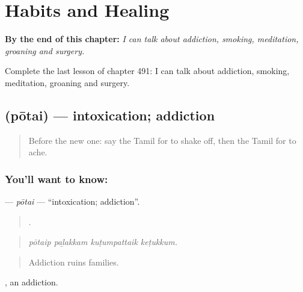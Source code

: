
\chapter{Habits and Healing}
\label{ch:ta-habits-and-healing}

\begin{chapteropening}
\textbf{By the end of this chapter:} \emph{I can talk about addiction, smoking, meditation, groaning and surgery.}

Complete the last lesson of chapter 491: I can talk about addiction, smoking, meditation, groaning and surgery.
\end{chapteropening}

\section[\texorpdfstring{\ta{போதை} (pōtai)}{போதை (pōtai)}]{ (pōtai) — intoxication; addiction}

\label{lesson:TA-C491-potai}



\begin{quote}
Before the new one: say the Tamil for to shake off, then the Tamil for to ache.
\end{quote}

\subsection*{You'll want to know: }
\textbf{} — \emph{pōtai} — \textquotedblleft{}intoxication; addiction\textquotedblright{}.

\begin{quote}
   .
\end{quote}

\begin{quote}
\emph{pōtaip paḻakkam kuṭumpattaik keṭukkum.}
\end{quote}

\begin{quote}
Addiction ruins families.
\end{quote}

 , an addiction.

